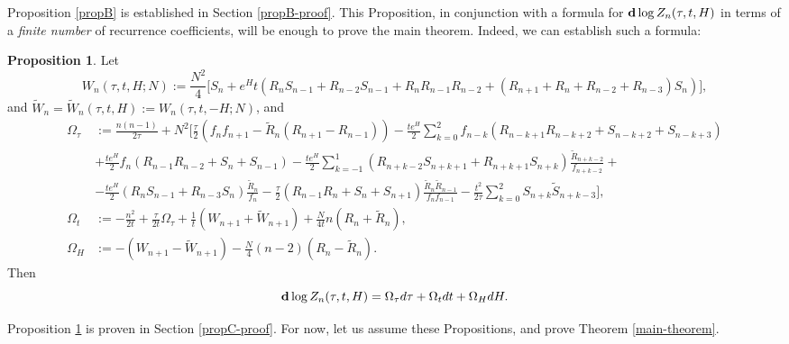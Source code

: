 \documentclass[usenames,dvipsnames]{article}
\theoremstyle{definition}
\newtheorem{prop}{Proposition}[section]
\numberwithin{equation}{section}
\numberwithin{figure}{section}
\begin{document}
 Proposition \ref{propB} is established in Section \ref{propB-proof}. This Proposition, in conjunction with a formula for ${\bf d}\log Z_n(\tau,t,H)$ in terms of a \textit{finite number} of recurrence coefficients, will be enough to prove the main theorem. Indeed, we can establish such a formula:
\begin{prop}\label{propC}
Let
    \begin{equation}
        W_n(\tau,t,H;N):=\frac{N^2}{4}\bigg[S_n+e^Ht(R_{n}S_{n-1}+R_{n-2}S_{n-1}+R_{n}R_{n-1}R_{n-2}+(R_{n+1}+R_n+R_{n-2}+R_{n-3})S_n)\bigg],
    \end{equation}
    and $\tilde{W}_n = \tilde{W}_n(\tau,t,H) := W_n(\tau,t,-H;N)$, and
    \begin{align}
        \Omega_{\tau} &:= \frac{n(n-1)}{2\tau} + N^2\bigg[\frac{\tau}{2}\left(f_nf_{n+1}-\tilde{R}_n(R_{n+1}-R_{n-1})\right) -\frac{te^H}{2}\sum_{k=0}^{2} f_{n-k}\left(R_{n-k+1}R_{n-k+2} + S_{n-k+2}+S_{n-k+3}\right) \nonumber\\
        &+\frac{te^H}{2}f_n\left(R_{n-1}R_{n-2}+S_n+S_{n-1}\right)-\frac{te^H}{2}\sum_{k=-1}^{1}(R_{n+k-2}S_{n+k+1}+R_{n+k+1}S_{n+k})\frac{\tilde{R}_{n+k-2}}{f_{n+k-2}} + \nonumber\\
        &-\frac{te^H}{2}(R_nS_{n-1}+R_{n-3}S_n)\frac{\tilde{R}_n}{f_n}-\frac{\tau}{2}(R_{n-1}R_n+S_n+S_{n+1})\frac{\tilde{R}_n\tilde{R}_{n-1}}{f_nf_{n-1}}-\frac{t^2}{2\tau}\sum_{k=0}^{2}S_{n+k}\tilde{S}_{n+k-3}\bigg], \label{dlogZ_dtau}\\
        \Omega_{t} &:= -\frac{n^2}{2t} + \frac{\tau}{2t}\Omega_{\tau} + \frac{1}{t}(W_{n+1}+\tilde{W}_{n+1}) +\frac{N}{4t}n(R_n+\tilde{R}_n),\label{dlogZ_dt}\\
        \Omega_{H} &:= -(W_{n+1}-\tilde{W}_{n+1})-\frac{N}{4}(n-2)\left(R_n-\tilde{R}_n\right).\label{dlogZ_dH}
    \end{align}
    Then
    \begin{equation}
        {\bf d}\log Z_n(\tau,t,H) = \Omega_{\tau} d\tau + \Omega_t dt + \Omega_H dH.
    \end{equation}
\end{prop}
Proposition \ref{propC} is proven in Section \ref{propC-proof}.
For now, let us assume these Propositions, and prove Theorem \ref{main-theorem}.
\end{document}

